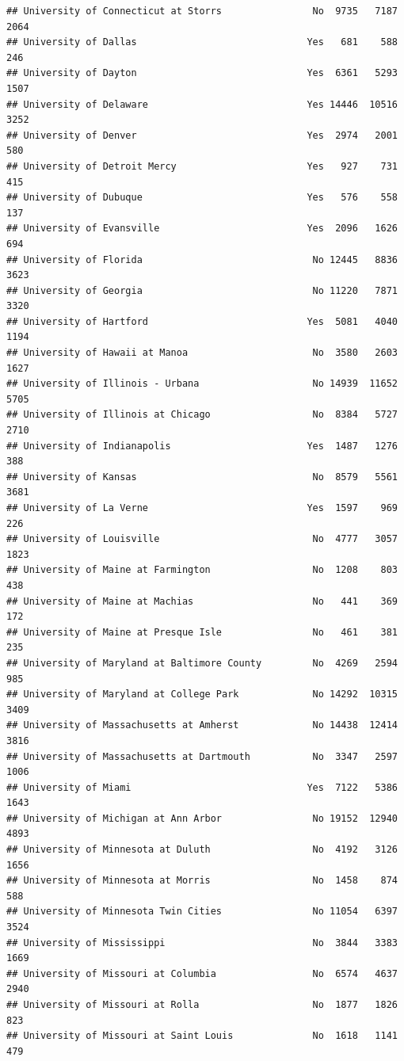 \documentclass[
]{article}
\begin{document}
\begin{verbatim}
## University of Connecticut at Storrs                No  9735   7187   2064
## University of Dallas                              Yes   681    588    246
## University of Dayton                              Yes  6361   5293   1507
## University of Delaware                            Yes 14446  10516   3252
## University of Denver                              Yes  2974   2001    580
## University of Detroit Mercy                       Yes   927    731    415
## University of Dubuque                             Yes   576    558    137
## University of Evansville                          Yes  2096   1626    694
## University of Florida                              No 12445   8836   3623
## University of Georgia                              No 11220   7871   3320
## University of Hartford                            Yes  5081   4040   1194
## University of Hawaii at Manoa                      No  3580   2603   1627
## University of Illinois - Urbana                    No 14939  11652   5705
## University of Illinois at Chicago                  No  8384   5727   2710
## University of Indianapolis                        Yes  1487   1276    388
## University of Kansas                               No  8579   5561   3681
## University of La Verne                            Yes  1597    969    226
## University of Louisville                           No  4777   3057   1823
## University of Maine at Farmington                  No  1208    803    438
## University of Maine at Machias                     No   441    369    172
## University of Maine at Presque Isle                No   461    381    235
## University of Maryland at Baltimore County         No  4269   2594    985
## University of Maryland at College Park             No 14292  10315   3409
## University of Massachusetts at Amherst             No 14438  12414   3816
## University of Massachusetts at Dartmouth           No  3347   2597   1006
## University of Miami                               Yes  7122   5386   1643
## University of Michigan at Ann Arbor                No 19152  12940   4893
## University of Minnesota at Duluth                  No  4192   3126   1656
## University of Minnesota at Morris                  No  1458    874    588
## University of Minnesota Twin Cities                No 11054   6397   3524
## University of Mississippi                          No  3844   3383   1669
## University of Missouri at Columbia                 No  6574   4637   2940
## University of Missouri at Rolla                    No  1877   1826    823
## University of Missouri at Saint Louis              No  1618   1141    479

\end{verbatim}
\end{document}
